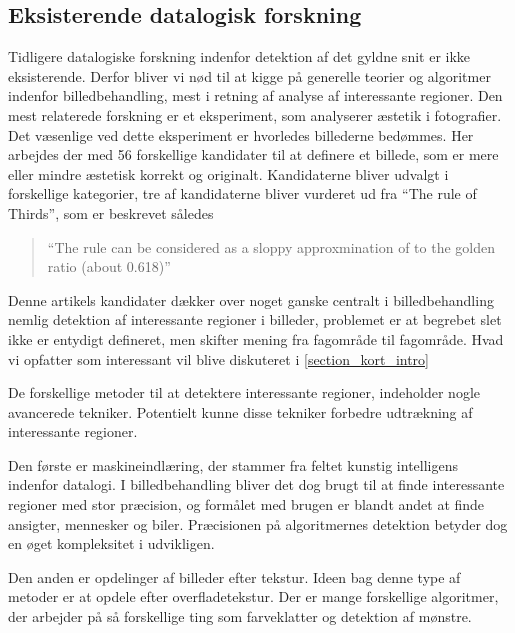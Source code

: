 {\subsection{Eksisterende datalogisk forskning}
Tidligere datalogiske forskning indenfor detektion af det gyldne snit er
ikke eksisterende. Derfor bliver vi nød til at kigge på generelle teorier og algoritmer
indenfor billedbehandling, mest i retning af  analyse af interessante
regioner. Den mest relaterede forskning er et eksperiment, som
analyserer æstetik i fotografier\cite{DattaWang}.
Det væsenlige ved dette eksperiment er hvorledes billederne
bedømmes. Her arbejdes der med 56 forskellige kandidater til at definere
et billede, som er mere eller mindre æstetisk korrekt og originalt. 
Kandidaterne bliver udvalgt i forskellige kategorier, tre af
kandidaterne bliver vurderet ud fra ``The rule of Thirds'', som er
beskrevet således
\begin{quote}
	``The rule can be considered as a sloppy approxmination of to the
	golden ratio (about 0.618)''
\end{quote}

Denne artikels kandidater dækker over noget ganske centralt i
billedbehandling nemlig detektion af
interessante regioner i billeder, problemet er at begrebet slet ikke er
entydigt defineret, men skifter mening fra fagområde til fagområde.
Hvad vi opfatter som interessant vil blive diskuteret i \ref{section_kort_intro}

De forskellige metoder til at detektere interessante regioner, indeholder nogle avancerede tekniker.
Potentielt kunne disse tekniker forbedre udtrækning af interessante regioner.

Den første er maskineindlæring, der stammer fra feltet kunstig
intelligens indenfor datalogi. I billedbehandling bliver det dog
brugt til at finde interessante regioner med stor præcision, og formålet
med brugen er blandt andet at finde ansigter, mennesker og
biler\cite{ViolaJones01,SchneidermanKanade00,Gabor}. Præcisionen på
algoritmernes detektion betyder dog en øget kompleksitet i udvikligen. 

Den anden er opdelinger af billeder efter tekstur. Ideen bag denne type
af metoder er at opdele efter
overfladetekstur\cite{218442,CarsonBelongie02,PapageorgiouPoggio}.
Der er mange forskellige algoritmer, der arbejder på så forskellige ting
som farveklatter og detektion af mønstre\cite{PalPal}.

}
